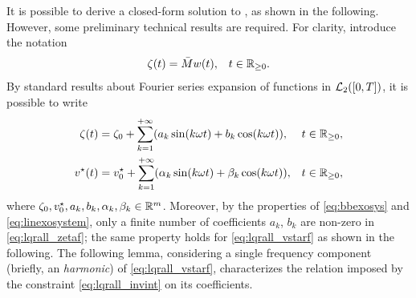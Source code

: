 It is possible to derive a closed-form solution to , as shown in the following. However, some preliminary technical results are required. For clarity, introduce the notation
\begin{align}
  \label{eq:lqrall_zw}
  \zeta(t) &= \bar{M}w(t), & t\in\mathbb{R}_{\geq 0}.
\end{align}
By standard results about Fourier series expansion of functions in $\mathcal{L}_2([0,T])$, it is possible to write
\begin{subequations}
	\label{eq:lqrall_fseries}
	\begin{align}
		\zeta(t)     & = \zeta_0 + \sum_{k=1}^{+\infty} (a_k \sin(k \omega t) + b_k \cos(k \omega t)), & t\in\mathbb{R}_{\geq 0},\label{eq:lqrall_zetaf}               \\
		v^{\star}(t) & = v^{\star}_0 + \sum_{k=1}^{+\infty} (\alpha_k \sin(k \omega t) + \beta_k \cos(k \omega t)), & t\in\mathbb{R}_{\geq 0},\label{eq:lqrall_vstarf}
	\end{align}
\end{subequations}
where $\zeta_0,v^{\star}_0,a_k,b_k,\alpha_k,\beta_k\in\mathbb{R}^m$. Moreover, by the properties of \eqref{eq:bbexosys} and \eqref{eq:linexosystem}, only a finite number of coefficients $a_k$, $b_k$ are non-zero in \eqref{eq:lqrall_zetaf}; the same property holds for \eqref{eq:lqrall_vstarf} as shown in the following. The following lemma, considering a single frequency component (briefly, an \emph{harmonic}) of \eqref{eq:lqrall_vstarf}, characterizes the relation imposed by the constraint \eqref{eq:lqrall_invint} on its coefficients.

